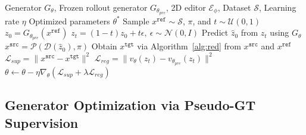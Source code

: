 \documentclass[runningheads]{llncs}
\begin{document}
\begin{algorithm}[t]
    \caption{Closed-loop Optimization via Dynamic Pseudo-GTs}
    \label{alg:oreo}
    \begin{algorithmic}[1]
    \Require Generator $G_\theta$, Frozen rollout generator $G_{\theta_{pre}}$, 2D editor $\mathcal{E}_\phi$, Dataset $\mathcal{S}$, Learning rate $\eta$
    \Ensure Optimized parameters $\theta^*$
        \State Sample $x^{\texttt{ref}} \sim \mathcal{S}$, $\pi$, and $t \sim \mathcal{U}(0,1)$
        \State $z_0 = G_{\theta_{pre}}(x^{\texttt{ref}})$ 
        \State $z_t = (1-t)z_0 + t\epsilon,\ \epsilon \sim \mathcal{N}(0,I)$ 
        \State Predict $\hat{z}_0$ from $z_t$ using $G_\theta$ 
        \State $x^{\texttt{src}} = \mathcal{P}(\mathcal{D}(\hat{z}_0), \pi)$ 
        \State Obtain $x^{\texttt{tgt}}$ via Algorithm~\ref{alg:red} from $x^{\texttt{src}}$ and $x^{\texttt{ref}}$ 
        \State $\mathcal{L}_{sup} = \| x^{\texttt{src}} - x^{\texttt{tgt}} \|^2$ 
        \State $\mathcal{L}_{reg} = \| v_\theta(z_t) - v_{\theta_{pre}}(z_t) \|^2$ 
        \State $\theta \leftarrow \theta - \eta \nabla_\theta (\mathcal{L}_{sup} + \lambda \mathcal{L}_{reg})$ 
    \EndWhile
    \end{algorithmic}
    \end{algorithm}
    


\subsection{Generator Optimization via Pseudo-GT Supervision}
\label{sec:optimization}
\end{document}

